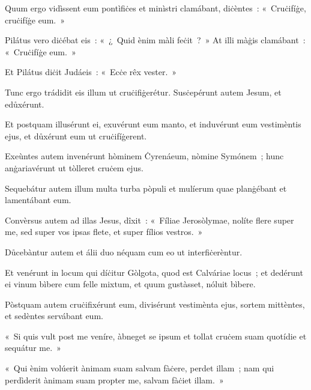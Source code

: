 Quum ergo vidìssent eum pontìfiċes et minìstri clamábant, diċèntes~: «~Cruċifíġe, cruċifíġe eum.~» 

Pilátus vero diċébat eis~: «~¿~Quid ènim màli feċit~?~» At illi màġis clamábant~: «~Cruċifíġe eum.~» 

Et Pilátus diċit Judáeis~: «~Ecċe rêx vester.~» 

Tunc ergo trádidit eis illum ut cruċifiġerétur. Susċepérunt autem Jesum, et edůxérunt. 

\mysteryEnd
{}

Et postquam illusérunt ei, exuvérunt eum manto, et induvérunt eum vestimèntis ejus, et důxérunt eum ut cruċifíġerent. 

Exeùntes autem invenérunt hòminem Ċyrenáeum, nòmine Symónem~; hunc anġariavérunt ut tòlleret cruċem ejus. 

Sequebátur autem illum multa turba pòpuli et mulíerum quae planġébant et lamentábant eum. 

Convèrsus autem ad illas Jesus, dîxit~: «~Fíliae Jerosòlymae, nolíte flere super me, sed super vos ipsas flete, et super fílios vestros.~» 

Důcebàntur autem et álii duo néquam cum eo ut interfiċerèntur. 

Et venérunt in locum qui díċitur Gòlgota, quod est Calváriae locus~; et dedérunt ei vinum bìbere cum felle mixtum, et quum gustàsset, nóluit bìbere. 

Pòstquam autem cruċifixérunt eum, divisérunt vestimènta ejus, sortem mittèntes, et sedèntes servábant eum. 

«~Si quis vult post me veníre, àbneget se ipsum et tollat cruċem suam quotídie et sequátur me.~» 

«~Qui ènim volúerit ànimam suam salvam fàċere, perdet illam~; nam qui perdìderit ànimam suam propter me, salvam fàċiet illam.~» 


